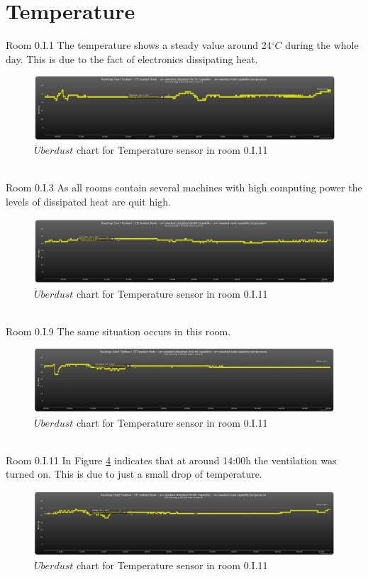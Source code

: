 \documentclass[12pt,a4paper,draft]{report}
\begin{document}
\section{Temperature}
%
{Room 0.I.1}
%
The temperature shows a steady value around 24$^\circ C$ during the whole day.
This is due to the fact of electronics dissipating heat. %
\begin{figure}[H]
\centering
	\includegraphics*[scale=0.3]{temp_1}
	\caption{$\ddot{U}berdust$ chart for Temperature sensor in room 0.I.11}
	\label{chart_temp_1}
\end{figure}
\ \\
%
{Room 0.I.3}
%
As all rooms contain several machines with high computing power the levels of dissipated heat are quit high.
\begin{figure}[H]
\centering
	\includegraphics*[scale=0.3]{temp_3}
	\caption{$\ddot{U}berdust$ chart for Temperature sensor in room 0.I.11}
	\label{chart_temp_3}
\end{figure}
\ \\
%
{Room 0.I.9}
%
The same situation occurs in this room.
\begin{figure}[H]
\centering
	\includegraphics*[scale=0.3]{temp_9}
	\caption{$\ddot{U}berdust$ chart for Temperature sensor in room 0.I.11}
	\label{chart_temp_9}
\end{figure}
\ \\
%
{Room 0.I.11}
%
In Figure \ref{chart_temp_11} indicates that at around 14:00h the ventilation was turned on.
This is due to just a small drop of temperature. %
\begin{figure}[H]
\centering
	\includegraphics*[scale=0.3]{temp_11}
	\caption{$\ddot{U}berdust$ chart for Temperature sensor in room 0.I.11}
	\label{chart_temp_11}
\end{figure}
\ \\
%
\end{document}
